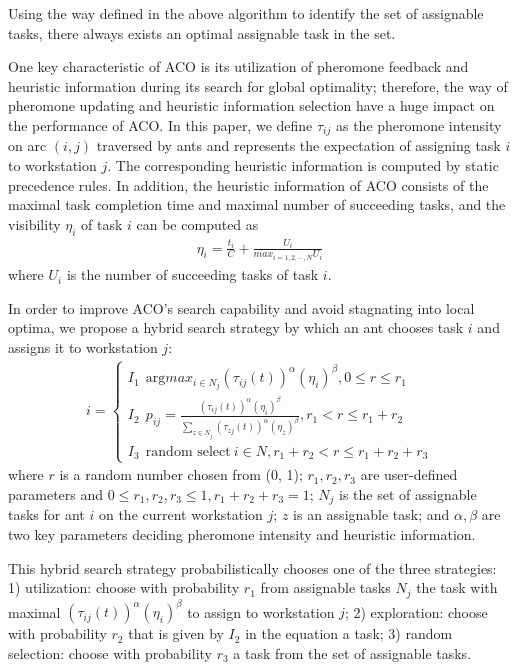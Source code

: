 Using the way defined in the above algorithm to identify the set of assignable tasks, there always exists an optimal assignable task in the set.

One key characteristic of ACO is its utilization of pheromone feedback and heuristic information during its search for global optimality; therefore, the way of pheromone updating and heuristic information selection have a huge impact on the performance of ACO.
In this paper, we define $\tau_{ij}$ as the pheromone intensity on arc $(i,j)$ traversed by ants and represents the expectation of assigning task $i$ to workstation $j$.
The corresponding heuristic information is computed by static precedence rules.
In addition, the heuristic information of ACO consists of the maximal task completion time and maximal number of succeeding tasks, and the visibility $\eta_i$ of task $i$ can be computed as
\begin{align}
	\eta_i = \frac{t_i}{C} + \frac{U_i}{max_{i = 1, 2, \cdots, N}U_i}
\end{align}
where $U_i$ is the number of succeeding tasks of task $i$.

In order to improve ACO's search capability and avoid stagnating into local optima, we propose a hybrid search strategy by which an ant chooses task $i$ and assigns it to workstation $j$:
\begin{align}
	i=\begin{cases}
	I_1 \ \ \text{arg} max_{i \in N_j}(\tau_{ij}(t))^{\alpha} (\eta_i)^{\beta}, 0 \leq r \leq r_1 \\
	I_2 \ \ p_{ij} = \frac{(\tau_{ij}(t))^{\alpha} (\eta_i)^{\beta}}{\sum_{z \in N_j}(\tau_{zj}(t))^{\alpha} (\eta_z)^{\beta}}, r_1 < r \leq r_1 + r_2 \\
	I_3 \ \ \text{random select} \ i \in N, r_1 + r_2 < r \leq r_1 + r_2 + r_3
	\end{cases} \label{formula7}
\end{align}
where $r$ is a random number chosen from (0, 1); $r_1, r_2, r_3$ are user-defined parameters and $0 \leq r_1, r_2, r_3 \leq 1, r_1 + r_2 + r_3 = 1$; $N_j$ is the set of assignable tasks for ant $i$ on the current workstation $j$; $z$ is an assignable task; and $\alpha, \beta$ are two key parameters deciding pheromone intensity and heuristic information.

This hybrid search strategy probabilistically chooses one of the three strategies: 1) utilization: choose with probability $r_1$ from assignable tasks $N_j$ the task with maximal $(\tau_{ij}(t))^{\alpha} (\eta_i)^{\beta}$ to assign to workstation $j$; 2) exploration: choose with probability $r_2$ that is given by $I_2$ in the equation a task; 3) random selection: choose with probability $r_3$ a task from the set of assignable tasks.

